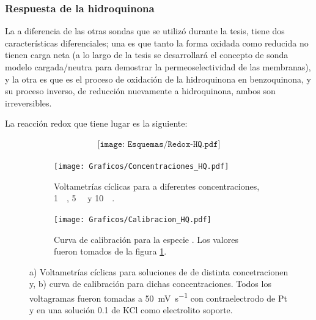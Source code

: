 {		\subsubsection*{Respuesta de la hidroquinona}
		 	 
		 	 	 La \hq\space a diferencia de las otras sondas que se utilizó durante la tesis, tiene dos características diferenciales; una es que tanto la forma oxidada como reducida no tienen carga neta (a lo largo de la tesis se desarrollará el concepto de sonda modelo cargada/neutra para demostrar la permeoselectividad de las membranas),  y la otra es que es el proceso de oxidación de la hidroquinona en benzoquinona, y su proceso inverso, de reducción nuevamente a hidroquinona, ambos son irreversibles. 

		 	 	 La reacción redox que tiene lugar es la siguiente:
		 	 
		 	 	 				\begin{equation}
		 	 	 				\begin{aligned}
		 	 	 				\texttt{[image: Esquemas/Redox-HQ.pdf]}
		 	 	 				\end{aligned}
		 	 	 				\end{equation}
				 			\begin{figure}[ht]
				 	     \begin{subfigure}[t]{0.495\textwidth}
				         	\texttt{[image: Graficos/Concentraciones\_HQ.pdf]}
				        	\caption{Voltametrías cíclicas para \hq\space a diferentes concentraciones, \SI{1}{\milli\Molar}, \SI{5}{\milli\Molar} y \SI{10}{\milli\Molar}.}
				         	\label{fig:HQ_a}
				     		\end{subfigure}
			     		 \begin{subfigure}[t]{0.495\textwidth}
				        	\texttt{[image: Graficos/Calibracion\_HQ.pdf]}
				       		\caption{Curva de calibración para la especie \hq. Los valores fueron tomados de la figura \ref{fig:HQ_a}.}
				         	\label{fig:HQ_b}
				     		\end{subfigure}
				     	 \caption[Respuesta electroquímica para \hq]{a) Voltametrías cíclicas para soluciones de \hq\space de distinta concetracionen y, b) curva de calibración para dichas concentraciones. Todos los voltagramas fueron tomadas a \SI{50}{\milli\volt\per\second} con contraelectrodo de Pt y en una solución \SI{0.1}{\Molar} de KCl como electrolito soporte.}
			     		 \label{fig:HQ}
			     		 \end{figure} 
		 
}
